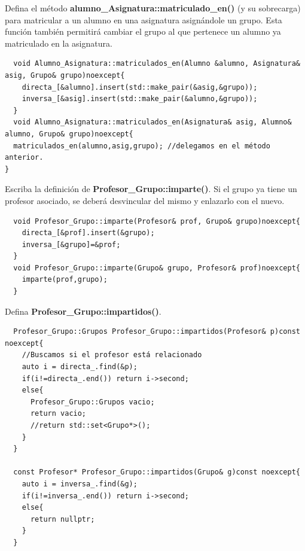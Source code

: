  Defina el método \textbf{alumno\_Asignatura::matriculado\_en()} (y su sobrecarga) para matricular a un alumno en una asignatura asignándole un grupo. Esta función también permitirá cambiar el grupo al que pertenece un alumno ya matriculado en la  asignatura.
\begin{verbatim}
  void Alumno_Asignatura::matriculados_en(Alumno &alumno, Asignatura& asig, Grupo& grupo)noexcept{
    directa_[&alumno].insert(std::make_pair(&asig,&grupo));
    inversa_[&asig].insert(std::make_pair(&alumno,&grupo));
  }
  void Alumno_Asignatura::matriculados_en(Asignatura& asig, Alumno& alumno, Grupo& grupo)noexcept{
  matriculados_en(alumno,asig,grupo); //delegamos en el método anterior.
}
\end{verbatim}
 Escriba la definición de \textbf{Profesor\_Grupo::imparte()}. Si el grupo ya tiene un profesor asociado, se deberá desvincular del mismo y enlazarlo con el nuevo.
\begin{verbatim}
  void Profesor_Grupo::imparte(Profesor& prof, Grupo& grupo)noexcept{
    directa_[&prof].insert(&grupo);
    inversa_[&grupo]=&prof;
  }
  void Profesor_Grupo::imparte(Grupo& grupo, Profesor& prof)noexcept{
    imparte(prof,grupo);
  }
\end{verbatim}
 Defina \textbf{Profesor\_Grupo::impartidos()}.
\begin{verbatim}
  Profesor_Grupo::Grupos Profesor_Grupo::impartidos(Profesor& p)const noexcept{
    //Buscamos si el profesor está relacionado
    auto i = directa_.find(&p);
    if(i!=directa_.end()) return i->second;
    else{
      Profesor_Grupo::Grupos vacio;
      return vacio;
      //return std::set<Grupo*>();
    }
  }

  const Profesor* Profesor_Grupo::impartidos(Grupo& g)const noexcept{
    auto i = inversa_.find(&g);
    if(i!=inversa_.end()) return i->second;
    else{
      return nullptr;
    }
  }
\end{verbatim}
